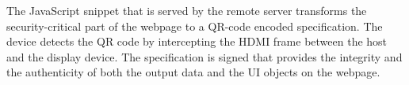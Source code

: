 The JavaScript snippet that is served by the remote server transforms the security-critical part of the webpage to a QR-code encoded specification. The device detects the QR code by intercepting the HDMI frame between the host and the display device. The specification is signed that provides the integrity and the authenticity of both the output data and the UI objects on the webpage. 

